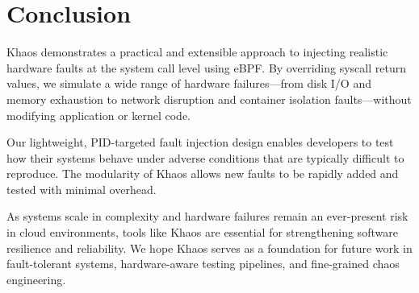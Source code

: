 \section{Conclusion}

Khaos demonstrates a practical and extensible approach to injecting realistic hardware faults at the system call level using eBPF. By overriding syscall return values, we simulate a wide range of hardware failures—from disk I/O and memory exhaustion to network disruption and container isolation faults—without modifying application or kernel code. 

Our lightweight, PID-targeted fault injection design enables developers to test how their systems behave under adverse conditions that are typically difficult to reproduce. The modularity of Khaos allows new faults to be rapidly added and tested with minimal overhead.

As systems scale in complexity and hardware failures remain an ever-present risk in cloud environments, tools like Khaos are essential for strengthening software resilience and reliability. We hope Khaos serves as a foundation for future work in fault-tolerant systems, hardware-aware testing pipelines, and fine-grained chaos engineering.
